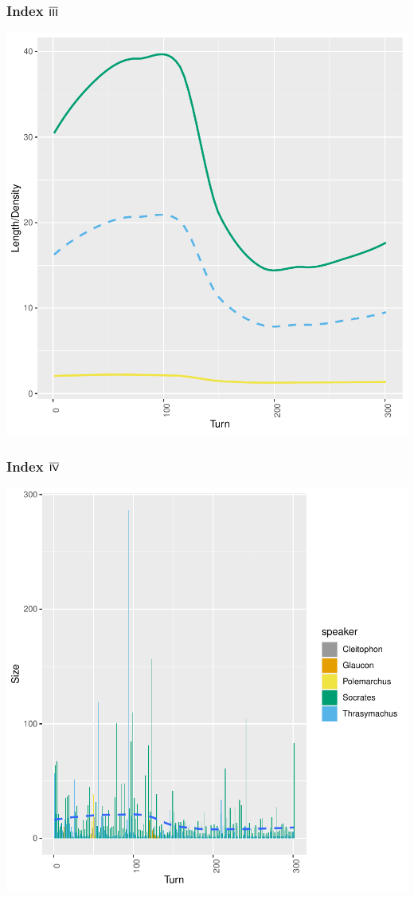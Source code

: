 \documentclass{beamer}
\renewcommand{\Roman}[1]{$\overline{\textsf{\small{\MakeUppercase{\romannumeral #1}}}}$}
\begin{document}

\begin{frame}[fragile]
\frametitle{Index \Roman{3}}
\includegraphics{GreatSlideshow-012}
\end{frame}



\begin{frame}[fragile]
\frametitle{Index \Roman{4}}
\includegraphics{GreatSlideshow-013}
\end{frame}
\end{document}
